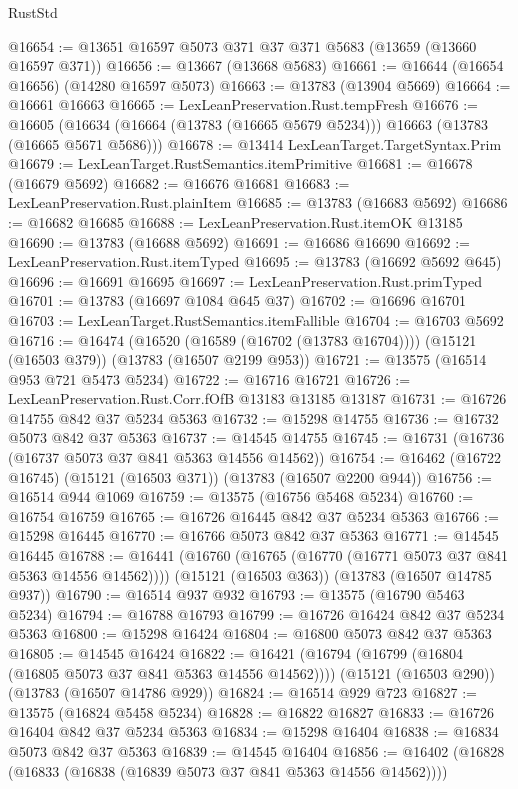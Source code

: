 \begin{lexlean}{RustStd}
\begin{coremodule}
@16654 := @13651 @16597 @5073 @371 @37 @371 @5683 (@13659 (@13660 @16597 @371))
@16656 := @13667 (@13668 @5683)
@16661 := @16644 (@16654 @16656) (@14280 @16597 @5073)
@16663 := @13783 (@13904 @5669)
@16664 := @16661 @16663
@16665 := LexLeanPreservation.Rust.tempFresh
@16676 := @16605
    (@16634 (@16664 (@13783 (@16665 @5679 @5234))) @16663 (@13783 (@16665 @5671 @5686)))
@16678 := @13414 LexLeanTarget.TargetSyntax.Prim
@16679 := LexLeanTarget.RustSemantics.itemPrimitive
@16681 := @16678 (@16679 @5692)
@16682 := @16676 @16681
@16683 := LexLeanPreservation.Rust.plainItem
@16685 := @13783 (@16683 @5692)
@16686 := @16682 @16685
@16688 := LexLeanPreservation.Rust.itemOK @13185
@16690 := @13783 (@16688 @5692)
@16691 := @16686 @16690
@16692 := LexLeanPreservation.Rust.itemTyped
@16695 := @13783 (@16692 @5692 @645)
@16696 := @16691 @16695
@16697 := LexLeanPreservation.Rust.primTyped
@16701 := @13783 (@16697 @1084 @645 @37)
@16702 := @16696 @16701
@16703 := LexLeanTarget.RustSemantics.itemFallible
@16704 := @16703 @5692
@16716 := @16474
    (@16520 (@16589 (@16702 (@13783 @16704))))
    (@15121 (@16503 @379))
    (@13783 (@16507 @2199 @953))
@16721 := @13575 (@16514 @953 @721 @5473 @5234)
@16722 := @16716 @16721
@16726 := LexLeanPreservation.Rust.Corr.fOfB @13183 @13185 @13187
@16731 := @16726 @14755 @842 @37 @5234 @5363
@16732 := @15298 @14755
@16736 := @16732 @5073 @842 @37 @5363
@16737 := @14545 @14755
@16745 := @16731 (@16736 (@16737 @5073 @37 @841 @5363 @14556 @14562))
@16754 := @16462 (@16722 @16745) (@15121 (@16503 @371)) (@13783 (@16507 @2200 @944))
@16756 := @16514 @944 @1069
@16759 := @13575 (@16756 @5468 @5234)
@16760 := @16754 @16759
@16765 := @16726 @16445 @842 @37 @5234 @5363
@16766 := @15298 @16445
@16770 := @16766 @5073 @842 @37 @5363
@16771 := @14545 @16445
@16788 := @16441
    (@16760 (@16765 (@16770 (@16771 @5073 @37 @841 @5363 @14556 @14562))))
    (@15121 (@16503 @363))
    (@13783 (@16507 @14785 @937))
@16790 := @16514 @937 @932
@16793 := @13575 (@16790 @5463 @5234)
@16794 := @16788 @16793
@16799 := @16726 @16424 @842 @37 @5234 @5363
@16800 := @15298 @16424
@16804 := @16800 @5073 @842 @37 @5363
@16805 := @14545 @16424
@16822 := @16421
    (@16794 (@16799 (@16804 (@16805 @5073 @37 @841 @5363 @14556 @14562))))
    (@15121 (@16503 @290))
    (@13783 (@16507 @14786 @929))
@16824 := @16514 @929 @723
@16827 := @13575 (@16824 @5458 @5234)
@16828 := @16822 @16827
@16833 := @16726 @16404 @842 @37 @5234 @5363
@16834 := @15298 @16404
@16838 := @16834 @5073 @842 @37 @5363
@16839 := @14545 @16404
@16856 := @16402
    (@16828 (@16833 (@16838 (@16839 @5073 @37 @841 @5363 @14556 @14562))))

\end{coremodule}
\end{lexlean}

